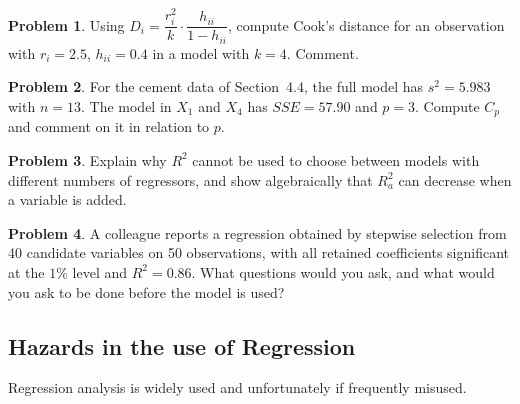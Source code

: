 \documentclass[11pt,a4paper]{article}
\theoremstyle{definition}
\newtheorem{problemx}{Problem}[section]
\newenvironment{problem}{\begin{problemx}}{\end{problemx}}
\begin{document}
\begin{problem}
Using $D_i=\dfrac{r_i^2}{k}\cdot\dfrac{h_{ii}}{1-h_{ii}}$, compute Cook's
distance for an observation with $r_i=2.5$, $h_{ii}=0.4$ in a model with
$k=4$. Comment.
\end{problem}

\begin{problem}
For the cement data of Section~4.4, the full model has $s^2=5.983$ with
$n=13$. The model in $X_1$ and $X_4$ has $SSE=57.90$ and $p=3$. Compute
$C_p$ and comment on it in relation to $p$.
\end{problem}

\begin{problem}
Explain why $R^2$ cannot be used to choose between models with different
numbers of regressors, and show algebraically that $R^2_a$ can decrease when a
variable is added.
\end{problem}

\begin{problem}
A colleague reports a regression obtained by stepwise selection from 40
candidate variables on 50 observations, with all retained coefficients
significant at the $1\%$ level and $R^2=0.86$. What questions would you ask,
and what would you ask to be done before the model is used?
\end{problem}

\newpage
\subsection{Hazards in the use of Regression}
Regression analysis is widely used and unfortunately if frequently misused.\\
\end{document}
